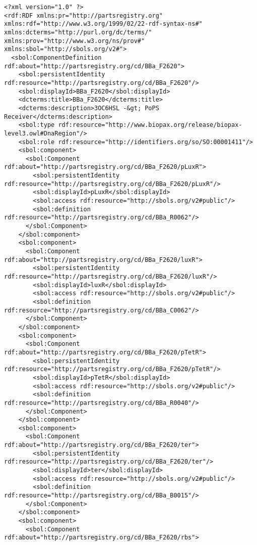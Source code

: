 \label{ser:F2620}
\begin{lstlisting}
<?xml version="1.0" ?>
<rdf:RDF xmlns:pr="http://partsregistry.org" xmlns:rdf="http://www.w3.org/1999/02/22-rdf-syntax-ns#" xmlns:dcterms="http://purl.org/dc/terms/" xmlns:prov="http://www.w3.org/ns/prov#" xmlns:sbol="http://sbols.org/v2#">
  <sbol:ComponentDefinition rdf:about="http://partsregistry.org/cd/BBa_F2620">
    <sbol:persistentIdentity rdf:resource="http://partsregistry.org/cd/BBa_F2620"/>
    <sbol:displayId>BBa_F2620</sbol:displayId>
    <dcterms:title>BBa_F2620</dcterms:title>
    <dcterms:description>3OC6HSL -&gt; PoPS Receiver</dcterms:description>
    <sbol:type rdf:resource="http://www.biopax.org/release/biopax-level3.owl#DnaRegion"/>
    <sbol:role rdf:resource="http://identifiers.org/so/SO:00001411"/>
    <sbol:component>
      <sbol:Component rdf:about="http://partsregistry.org/cd/BBa_F2620/pLuxR">
        <sbol:persistentIdentity rdf:resource="http://partsregistry.org/cd/BBa_F2620/pLuxR"/>
        <sbol:displayId>pLuxR</sbol:displayId>
        <sbol:access rdf:resource="http://sbols.org/v2#public"/>
        <sbol:definition rdf:resource="http://partsregistry.org/cd/BBa_R0062"/>
      </sbol:Component>
    </sbol:component>
    <sbol:component>
      <sbol:Component rdf:about="http://partsregistry.org/cd/BBa_F2620/luxR">
        <sbol:persistentIdentity rdf:resource="http://partsregistry.org/cd/BBa_F2620/luxR"/>
        <sbol:displayId>luxR</sbol:displayId>
        <sbol:access rdf:resource="http://sbols.org/v2#public"/>
        <sbol:definition rdf:resource="http://partsregistry.org/cd/BBa_C0062"/>
      </sbol:Component>
    </sbol:component>
    <sbol:component>
      <sbol:Component rdf:about="http://partsregistry.org/cd/BBa_F2620/pTetR">
        <sbol:persistentIdentity rdf:resource="http://partsregistry.org/cd/BBa_F2620/pTetR"/>
        <sbol:displayId>pTetR</sbol:displayId>
        <sbol:access rdf:resource="http://sbols.org/v2#public"/>
        <sbol:definition rdf:resource="http://partsregistry.org/cd/BBa_R0040"/>
      </sbol:Component>
    </sbol:component>
    <sbol:component>
      <sbol:Component rdf:about="http://partsregistry.org/cd/BBa_F2620/ter">
        <sbol:persistentIdentity rdf:resource="http://partsregistry.org/cd/BBa_F2620/ter"/>
        <sbol:displayId>ter</sbol:displayId>
        <sbol:access rdf:resource="http://sbols.org/v2#public"/>
        <sbol:definition rdf:resource="http://partsregistry.org/cd/BBa_B0015"/>
      </sbol:Component>
    </sbol:component>
    <sbol:component>
      <sbol:Component rdf:about="http://partsregistry.org/cd/BBa_F2620/rbs">

\end{lstlisting}
